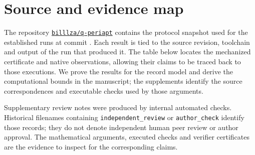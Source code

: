 \section{Source and evidence map}
\label{app:artifacts}

The repository \href{https://github.com/billlza/q-periapt}{\texttt{billlza/q-periapt}}
contains the protocol snapshot used for the established runs at commit
.
Each result is tied to the source revision, toolchain and output of
the run that produced it. The table below locates the mechanized
certificate and native observations, allowing their claims to be traced
back to those executions. We prove the results for the record model and
derive the computational bounds in the manuscript; the supplements
identify the source correspondences and executable checks used by those arguments.

Supplementary review notes were produced by internal automated checks.
Historical filenames containing \texttt{independent\_review} or
\texttt{author\_check} identify those records; they do not denote
independent human peer review or author approval. The mathematical
arguments, executed checks and verifier certificates are the evidence
to inspect for the corresponding claims.

